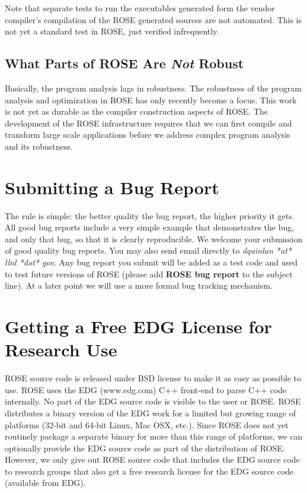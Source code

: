 Note that separate tests to run the executables generated form the vendor compiler's
compilation of the ROSE generated sources are not automated.  This is not yet a
standard test in ROSE, just verified infrequently.

\subsection{What Parts of ROSE Are {\em Not} Robust}
    Basically, the program analysis lags in robustness. The robustness of the program analysis and 
optimization in ROSE has only recently become a focus.
This work is not yet as durable as the compiler construction aspects of ROSE.
The development of the ROSE infrastructure requires that we can first compile
and transform large scale applications before we address complex program analysis
and its robustness.

\section{Submitting a Bug Report}
     The rule is simple: the better quality the bug report, the higher priority it
gets.  All good bug reports include a very simple example that demonstrates
the bug, and only that bug, so that it is clearly reproducible.  We welcome your submission
of good quality bug reports.  You may also send email directly to 
{\it dquinlan *at* llnl *dot* gov}.  Any bug report you submit will be added as a test 
code and used to test future versions of ROSE (please add {\bf ROSE bug report} to the 
subject line).  At a later point we will use a more formal bug tracking mechanism.


\section{Getting a Free EDG License for Research Use}

ROSE source code is released under BSD license to make it as easy as possible to use.
ROSE uses the EDG (www.edg.com) C++ front-end to parse C++ code internally.
No part of the EDG source code is visible to the user or ROSE. ROSE distributes
a binary version of the EDG work for a limited but growing range of platforms (32-bit and 
64-bit Linux, Mac OSX, etc.). Since ROSE does not yet routinely package a separate binary 
for more than this range of platforms, we can optionally provide the EDG source code as 
part of the distribution of ROSE.  However, we only give out ROSE source code that 
includes the EDG source code to research groups that also get a free research license 
for the EDG source code (available from EDG).  

